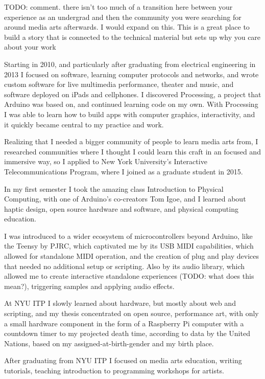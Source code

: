 TODO: comment. there isn't too much of a transition here between your experience as an undergrad and then the community you were searching for around media arts afterwards. I would expand on this. This is a great place to build a story that is connected to the technical material but sets up why you care about your work

Starting in 2010, and particularly after graduating from electrical engineering in 2013 I focused on software, learning computer protocols and networks, and wrote custom software for live multimedia performance, theater and music, and software deployed on iPads and cellphones. I discovered Processing, a project that Arduino was based on, and continued learning code on my own. With Processing I was able to learn how to build apps with computer graphics, interactivity, and it quickly became central to my practice and work.

Realizing that I needed a bigger community of people to learn media arts from, I researched communities where I thought I could learn this craft in an focused and immersive way, so I applied to New York University's Interactive Telecommunications Program, where I joined as a graduate student in 2015.

In my first semester I took the amazing class Introduction to Physical Computing, with one of Arduino's co-creators Tom Igoe, and I learned about haptic design, open source hardware and software, and physical computing education.

I was introduced to a wider ecosystem of microcontrollers beyond Arduino, like the Teensy by PJRC, which captivated me by its USB MIDI capabilities, which allowed for standalone MIDI operation, and the creation of plug and play devices that needed no additional setup or scripting. Also by its audio library, which allowed me to create interactive standalone experiences (TODO: what does this mean?), triggering samples and applying audio effects.

At NYU ITP I slowly learned about hardware,  but mostly about web and scripting, and my thesis concentrated on open source, performance art, with only a small hardware component in the form of a Raspberry Pi computer with a countdown timer to my projected death time, according to data by the United Nations, based on my assigned-at-birth-gender and my birth place.

After graduating from NYU ITP I focused on media arts education, writing tutorials, teaching introduction to programming workshops for artists.

